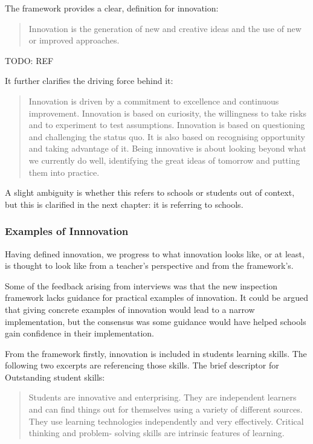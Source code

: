 The framework provides a clear, definition for innovation: \begin{quote}
Innovation is the generation of new and creative ideas and the use of new or improved approaches. 
\end{quote}TODO: REF 

It further clarifies the driving force behind it: 
\begin{quote}
Innovation is driven by a commitment to excellence and continuous improvement. Innovation is based on curiosity, the willingness to take risks and to experiment to test assumptions. Innovation is based on questioning and challenging the status quo. It is also based on recognising opportunity and taking advantage of it. Being innovative is about looking beyond what we currently do well, identifying the great ideas of tomorrow and putting them into practice.
\end{quote}

A slight ambiguity is whether this refers to schools or students out of context, but this is clarified in the next chapter: it is referring to schools.


\subsubsection{Examples of Innnovation}

Having defined innovation, we progress to what innovation looks like, or at least, is thought to look like from a teacher’s perspective and from the framework's.

Some of the feedback arising from interviews was that the new inspection framework lacks guidance for practical examples of innovation. It could be argued that giving concrete examples of innovation would lead to a narrow implementation, but the consensus was some guidance would have helped schools gain confidence in their implementation.

From the framework firstly, innovation is included in students learning skills. The following two excerpts are referencing those skills. The brief descriptor for Outstanding student skills: 

\begin{quote}
Students are innovative and enterprising. They are independent learners and can find things out for themselves using a variety of different sources. They use learning technologies independently and very effectively. Critical thinking and problem- solving skills are intrinsic features of learning.
\end{quote}


